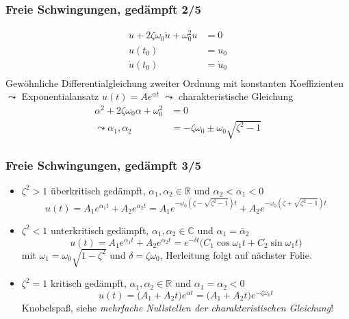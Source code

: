 \documentclass[hyperref={pdfpagemode=FullScreen, colorlinks=false}]{beamer}
\begin{document}
\begin{frame}
\frametitle{Freie Schwingungen, {\normalsize gedämpft 2/5}}
\begin{align*}
\ddot{u}+2 \zeta\omega_0\dot{u}+\omega_0^2 u&=0\\
u(t_0)&=u_0\\
\dot{u}(t_0)&=\dot{u}_0\\
\end{align*}
Gewöhnliche Differentialgleichung zweiter Ordnung mit konstanten Koeffizienten $\leadsto$ Exponentialansatz $u(t)=Ae^{\alpha t}$ $\leadsto$ charakteristische Gleichung
\begin{align*}
\alpha^2 + 2 \zeta\omega_0\alpha + \omega_0^2 &= 0 \\
\leadsto \alpha_{1}, \alpha_{2}&=- \zeta\omega_0\pm \omega_0\sqrt{ \zeta^2-1}
\end{align*}
\end{frame}


\begin{frame}
\frametitle{Freie Schwingungen, {\normalsize gedämpft 3/5}}
\begin{itemize}[<+->]

\item $\zeta^2>1$ überkritisch gedämpft, $\alpha_1, \alpha_2 \in \mathbb{R}$ und $\alpha_2 < \alpha_1 < 0$  
 \begin{equation*}
 u(t)=A_1 e^{\alpha_1 t}+ A_2 e^{\alpha_2 t}
 =A_1 e^{-\omega_0\left(\zeta-\sqrt{\zeta^2-1}\right)t}
 +A_2 e^{-\omega_0\left(\zeta+\sqrt{\zeta^2-1}\right)t}
 \end{equation*}
 
 \item $\zeta^2<1$ unterkritisch gedämpft, $\alpha_1, \alpha_2 \in \mathbb{C}$ und $\alpha_1=\bar{\alpha}_2$  
 \begin{equation*}
 u(t)= A_1 e^{\alpha_1 t}+ A_2 e^{\alpha_2 t}
 =e^{-\delta t}\bigl( C_1\cos\omega_1 t + C_2\sin\omega_1 t \bigr)
 \end{equation*}
 mit $\omega_1=\omega_0\sqrt{1- \zeta^2}$ und $\delta=\zeta\omega_0$, Herleitung folgt auf nächster Folie.
 
 \item $\zeta^2=1$ kritisch gedämpft,  $\alpha_1, \alpha_2 \in \mathbb{R}$ und $\alpha_1=\alpha_2<0$  
 \begin{equation*}
 u(t)= \bigl( A_1+A_2 t \bigr)e^{\alpha t}
 = \bigl( A_1+A_2 t \bigr)e^{-\zeta\omega_0 t}
 \end{equation*}
 Knobelspaß, siehe \textsl{mehrfache Nullstellen der charakteristischen Gleichung}!
\end{itemize}

\end{frame}
\end{document}
